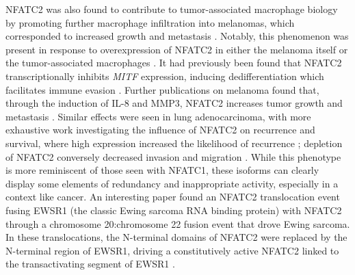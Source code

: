 NFATC2 was also found to contribute to tumor\hyp{}associated macrophage biology by promoting further macrophage infiltration into melanomas, which corresponded to increased growth and metastasis \citep{Daniel2014}. Notably, this phenomenon was present in response to overexpression of NFATC2 in either the melanoma itself or the tumor\hyp{}associated macrophages \citep{Liu2018}. It had previously been found that NFATC2 transcriptionally inhibits \textit{MITF} expression, inducing dedifferentiation which facilitates immune evasion \citep{Perotti2016}. Further publications on melanoma found that, through the induction of IL\hyp{}8 and MMP3, NFATC2 increases tumor growth and metastasis \citep{Shoshan2016}. Similar effects were seen in lung adenocarcinoma, with more exhaustive work investigating the influence of NFATC2 on recurrence and survival, where high expression increased the likelihood of recurrence \citep{Xiao2017}; depletion of NFATC2 conversely decreased invasion and migration \citep{Liu2013}. While this phenotype is more reminiscent of those seen with NFATC1, these isoforms can clearly display some elements of redundancy and inappropriate activity, especially in a context like cancer. An interesting paper found an NFATC2 translocation event fusing EWSR1 (the classic Ewing sarcoma RNA binding protein) with NFATC2 through a chromosome 20:chromosome 22 fusion event that drove Ewing sarcoma. In these translocations, the N\hyp{}terminal domains of NFATC2 were replaced by the N\hyp{}terminal region of EWSR1, driving a constitutively active NFATC2 linked to the transactivating segment of EWSR1 \citep{Szuhai2009}. 

